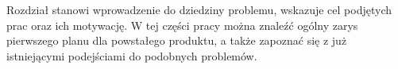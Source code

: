 \documentclass[polish,12pt]{aghthesis}
\author{Emilia Majerz, Aleksandra Pasternak}
\date{\the\year}
\begin{document}
\maketitle

\newpage

\tableofcontents

\newpage

\section{\SectionTitleProjectVision}
\label{sec:cel-wizja}
\par Rozdział stanowi wprowadzenie do dziedziny problemu, wskazuje cel podjętych prac oraz ich motywację. W tej części pracy można znaleźć ogólny zarys pierwszego planu dla powstałego produktu, a także zapoznać się z już istniejącymi podejściami do podobnych problemów.
\end{document}
